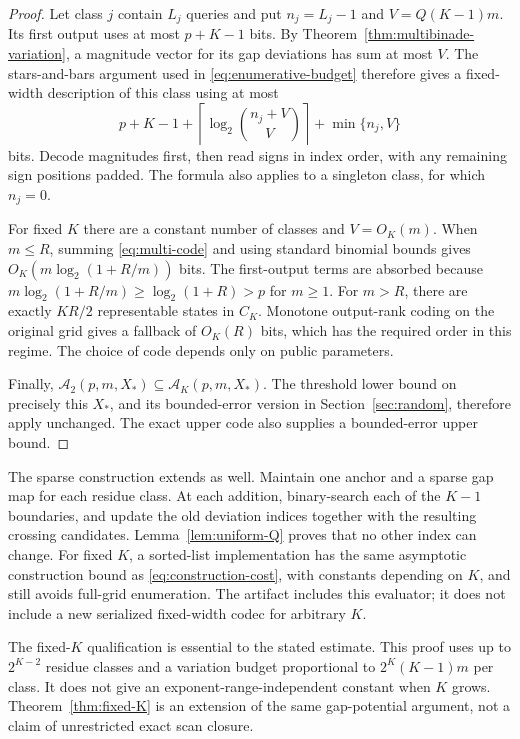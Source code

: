 \documentclass[11pt,reqno]{amsart}
\theoremstyle{definition}
\theoremstyle{remark}
\numberwithin{equation}{section}
\begin{document}
\begin{proof}
Let class $j$ contain $L_j$ queries and put $n_j=L_j-1$ and
$V=Q(K-1)m$. Its first output uses at most $p+K-1$ bits. By
Theorem~\ref{thm:multibinade-variation}, a magnitude vector for its gap
deviations has sum at most $V$. The stars-and-bars argument used in
\eqref{eq:enumerative-budget} therefore gives a fixed-width description of
this class using at most
\begin{equation}
\label{eq:multi-code}
 p+K-1+\left\lceil\log_2\binom{n_j+V}{V}\right\rceil
       +\min\{n_j,V\}
\end{equation}
bits. Decode magnitudes first, then read signs in index order, with any
remaining sign positions padded. The formula also applies to a singleton
class, for which $n_j=0$.

For fixed $K$ there are a constant number of classes and $V=O_K(m)$.
When $m\leq R$, summing \eqref{eq:multi-code} and using standard binomial
bounds gives $O_K(m\log_2(1+R/m))$ bits. The first-output terms are absorbed
because $m\log_2(1+R/m)\geq\log_2(1+R)>p$ for $m\geq1$.
For $m>R$, there are exactly $KR/2$ representable states in $C_K$.
Monotone output-rank coding on the original grid gives a fallback of
$O_K(R)$ bits, which has the required order in this regime. The choice of
code depends only on public parameters.

Finally, $\mathcal A_2(p,m,X_\ast)\subseteq\mathcal A_K(p,m,X_\ast)$.
The threshold lower bound on precisely this $X_\ast$, and its bounded-error
version in Section~\ref{sec:random}, therefore apply unchanged. The exact
upper code also supplies a bounded-error upper bound.
\end{proof}

The sparse construction extends as well. Maintain one anchor and a sparse
gap map for each residue class. At each addition, binary-search each of the
$K-1$ boundaries, and update the old deviation indices together with the
resulting crossing candidates. Lemma~\ref{lem:uniform-Q} proves that no
other index can change. For fixed $K$, a sorted-list implementation has the
same asymptotic construction bound as \eqref{eq:construction-cost}, with
constants depending on $K$, and still avoids full-grid enumeration. The
artifact includes this evaluator; it does not include a new serialized
fixed-width codec for arbitrary $K$.

The fixed-$K$ qualification is essential to the stated estimate. This proof
uses up to $2^{K-2}$ residue classes and a variation budget proportional to
$2^K(K-1)m$ per class. It does not give an exponent-range-independent
constant when $K$ grows. Theorem~\ref{thm:fixed-K} is an extension of the
same gap-potential argument, not a claim of unrestricted exact scan closure.
\end{document}
